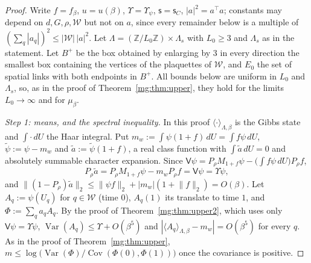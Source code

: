 \documentclass[11pt,a4paper]{article}
\theoremstyle{definition}
\theoremstyle{remark}
\DeclareMathOperator{\Cov}{Cov}
\DeclareMathOperator{\Var}{Var}
\newcommand{\Z}{\mathbb{Z}}
\newcommand{\dU}{\,dU}
\newcommand{\norm}[1]{\lVert #1\rVert}
\begin{document}
\begin{proof}
Write $f=f_\beta$, $u=u(\beta)$, $\Upsilon=\Upsilon_\psi$, $\mathsf s=\mathsf s_C$, $|a|^2=a^\top a$; constants may depend on $d,G,\rho,\mathcal W$ but not on $a$, since every
remainder below is a multiple of $(\sum_q|a_q|)^2\le|\mathcal W|\,|a|^2$. Let $\Lambda=(\Z/L_0\Z)\times\Lambda_s$ with $L_0\ge3$ and $\Lambda_s$ as in the statement. Let $B^+$ be the box obtained by
enlarging by $3$ in every direction the smallest box containing the vertices of the plaquettes of $\mathcal W$, and $E_0$ the set of spatial links with both
endpoints in $B^+$. All bounds below are uniform in $L_0$ and $\Lambda_s$, so, as in the proof of Theorem~\ref{mg:thm:upper}, they hold for the limits
$L_0\to\infty$ and for $\mu_\beta$.

\emph{Step 1: means, and the spectral inequality.} In this proof $\langle\cdot\rangle_{\Lambda,\beta}$ is the Gibbs state and $\int\cdot\dU$ the Haar integral. Put
$m_w:=\int\psi(1+f)\dU=\int f\psi\dU$, $\tilde\psi:=\psi-m_w$ and $\tilde a:=\tilde\psi(1+f)$, a real class function with $\int\tilde a\dU=0$ and absolutely summable
character expansion. Since $\mathsf V\psi=P_\rho M_{1+f}\psi-\bigl(\int f\psi\dU\bigr)P_\rho f$,
\[
P_\rho\tilde a=P_\rho M_{1+f}\psi-m_wP_\rho f=\mathsf V\psi=\Upsilon\psi ,
\]
and $\norm{(1-P_\rho)\tilde a}_2\le\norm{\psi f}_2+|m_w|(1+\norm f_2)=O(\beta)$. Let $A_q:=\psi(U_q)$ for $q\in\mathcal W$ (time $0$), $A_q(1)$ its translate to
time $1$, and $\Phi:=\sum_qa_qA_q$. By the proof of Theorem~\ref{mg:thm:upper2}, which uses only $\mathsf V\psi=\Upsilon\psi$,
$\Var(A_q)\le\Upsilon+O(\beta^5)$ and $|\langle A_q\rangle_{\Lambda,\beta}-m_w|=O(\beta^5)$ for every $q$. As in the proof of Theorem~\ref{mg:thm:upper},
$m\le\log\bigl(\Var(\Phi)/\Cov(\Phi(0),\Phi(1))\bigr)$ once the covariance is positive.


\end{proof}
\end{document}
